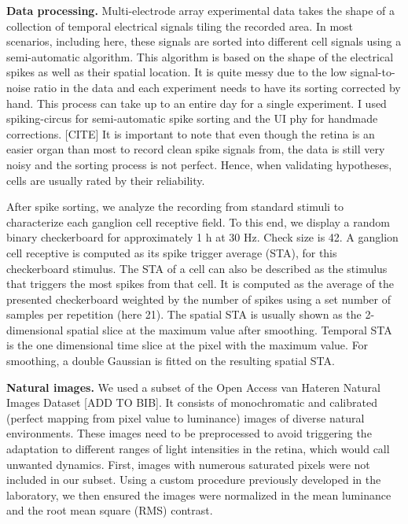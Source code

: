 \textbf{Data processing.}
Multi-electrode array experimental data takes the shape of a collection of
temporal electrical signals tiling the recorded area.
In most scenarios, including here, these signals are sorted into different cell
signals using a semi-automatic algorithm. This algorithm is based on the shape
of the electrical spikes as well as their spatial location. It is
quite messy due to the low signal-to-noise ratio in the data and each
experiment
needs to have its sorting corrected by hand. This process can take up to an
entire day for a single experiment. I used spiking-circus for semi-automatic
spike sorting and the UI phy for handmade corrections. [CITE]
It is important to note that even though the retina is an easier organ than
most to record clean spike signals from, the data is still very noisy and the
sorting process is not perfect. Hence, when validating hypotheses, cells are
usually rated by their reliability.

After spike sorting, we analyze the recording from standard stimuli to
characterize each
ganglion cell receptive field. To this end, we display a random binary
checkerboard for approximately 1 h at 30 Hz. Check size is 42\microns. A
ganglion cell receptive is computed as its spike trigger average (STA), for
this checkerboard stimulus. The STA of a cell can also be described as the
stimulus that triggers the most spikes from that cell. It is computed as the
average of the presented checkerboard weighted by the number of spikes using a
set number of samples per repetition (here 21). The spatial STA is usually
shown as the 2-dimensional spatial slice at the maximum value after smoothing.
Temporal STA is the one dimensional time slice at the pixel with the maximum
value. For smoothing, a double Gaussian is fitted on the resulting spatial
STA.


\textbf{Natural images.}
We used a subset of the Open Access van Hateren Natural Images Dataset [ADD TO
        BIB]. It consists of monochromatic and calibrated (perfect mapping from
pixel
value to luminance) images of diverse natural environments. These images need
to
be preprocessed to avoid triggering the adaptation to different ranges of light
intensities in the retina, which would call unwanted
dynamics. First, images with numerous saturated pixels were not included in our
subset. Using a custom procedure previously developed in the laboratory, we
then
ensured the images were normalized in the mean luminance and the root mean
square (RMS) contrast.

